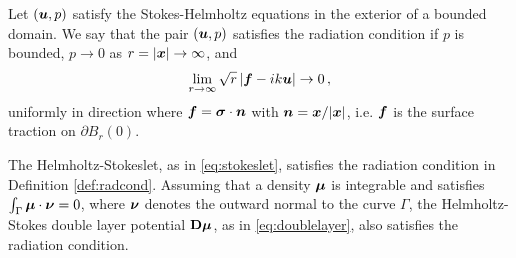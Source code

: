 \begin{definition} \label{def:radcond}
Let $({\boldsymbol u},p)$ satisfy the Stokes-Helmholtz equations in
the exterior of a bounded domain. We say that
the pair $({\boldsymbol u},p)$ satisfies the radiation condition if
$p$ is bounded, $p \to 0$ as $r = |{\boldsymbol x}| \to \infty$, and 
\begin{equation}
\lim_{r\to \infty} \sqrt{r} \left| {\boldsymbol f} - i k {\boldsymbol u} \right| \to 0 \, ,
\label{eq:radcond}
\end{equation}
uniformly in direction where ${\boldsymbol f} = {\boldsymbol \sigma} \cdot {\boldsymbol n}$
with ${\boldsymbol n} = {\boldsymbol x}/|{\boldsymbol x}|$, i.e. ${\boldsymbol f}$ is the surface
traction on $\partial B_r(0)$.     
\end{definition}

\begin{proposition}
The Helmholtz-Stokeslet, as in \eqref{eq:stokeslet}, satisfies
the radiation condition in Definition \ref{def:radcond}.
Assuming that a density ${\boldsymbol \mu}$ is integrable and satisfies
$\int_\Gamma {\boldsymbol \mu}\cdot {\boldsymbol \nu} = 0$, where ${\boldsymbol \nu}$ denotes the
outward normal to the curve $\Gamma$, the Helmholtz-Stokes
double layer potential ${\bf D}{\boldsymbol \mu}$, as in \eqref{eq:doublelayer},
also satisfies the radiation condition.
\end{proposition}


